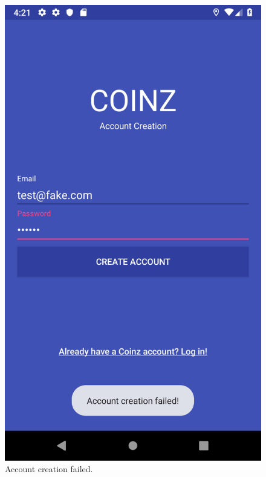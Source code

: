 \documentclass[11pt,a4paper,notitlepage]{article}
\begin{document}
\begin{figure}[H]
    \centering
    \begin{minipage}{0.48\textwidth}
        \includegraphics[scale=0.2]{screenshots/account-creation/account-creation-failed.png}
        \caption{Account creation failed.}
    \end{minipage}
    \begin{minipage}{0.48\textwidth}

\end{minipage}
\end{figure}
\end{document}
